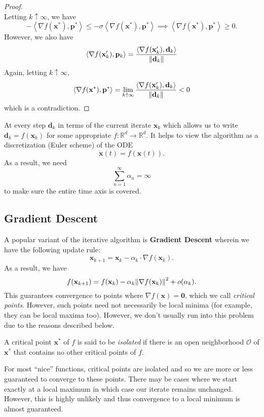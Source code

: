 \begin{proof}
\[    \]
    Letting $k \uparrow \infty$, we have
    \[
        -\left\langle \nabla f(\mathbf{x}^*), \mathbf{p}^* \right\rangle \leq -\sigma \left\langle \nabla f(\mathbf{x}^*), \mathbf{p}^* \right\rangle \implies \left\langle \nabla f(\mathbf{x}^*), \mathbf{p}^* \right\rangle \geq 0.
    \]
    However, we also have
    \[
        \left\langle \nabla f(\mathbf{x}^{\prime}_k), \mathbf{p}_k \right\rangle = \frac{\left\langle \nabla f(\mathbf{x}^{\prime}_k), \mathbf{d}_k \right\rangle}{\norm{\mathbf{d}_k}}
    \]
    Again, letting $k \uparrow \infty$, 
    \[
        \left\langle \nabla f(\mathbf{x}^*), \mathbf{p}^* \right\rangle = \lim_{k \uparrow \infty} \frac{\left\langle \nabla f(\mathbf{x}^{\prime}_k), \mathbf{d}_k \right\rangle}{\norm{\mathbf{d}_k}} < 0
    \]
    which is a contradiction. 
\end{proof}

At every step $\mathbf{d}_k$ in terms of the current iterate $\mathbf{x}_k$ which allows us to write $\mathbf{d}_k = f(\mathbf{x}_k)$ for some appropriate $f \colon \mathbb{R}^d \to \mathbb{R}^d$. It helps to view the algorithm as a discretization (Euler scheme) of the ODE
\[
    \dot{\mathbf{x}}(t) = f(\mathbf{x}(t)).
\]
As a result, we need
\[
    \sum_{n=1}^{\infty} \alpha_n = \infty
\]
to make sure the entire time axis is covered. 

\subsection*{Gradient Descent}

A popular variant of the iterative algorithm is \textbf{Gradient Descent} wherein we have the following update rule:
\[
    \mathbf{x}_{k+1} = \mathbf{x}_k - \alpha_k \cdot \nabla f(\mathbf{x}_k).
\]
As a result, we have
\[
    f(\mathbf{x}_{k+1}) = f(\mathbf{x}_k) - \alpha_k \norm{\nabla f(\mathbf{x}_k)}^2 + o(\alpha_k).
\]
This guarantees convergence to points where $\nabla f(\mathbf{x}) = \mathbf{0}$, which we call \textit{critical points}. However, such points need not necessarily be local minima (for example, they can be local maxima too). However, we don't usually run into this problem due to the reasons described below. 

\begin{defn}
    A critical point $\mathbf{x}^*$ of $f$ is said to be \emph{isolated} if there is an open neighborhood $\mathcal{O}$ of $\mathbf{x}^*$ that contains no other critical points of $f$.     
\end{defn}

For most ``nice'' functions, critical points are isolated and so we are more or less guaranteed to converge to these points. There may be cases where we start exactly at a local maximum in which case our iterate remains unchanged. However, this is highly unlikely and thus convergence to a local minimum is almost guaranteed. 